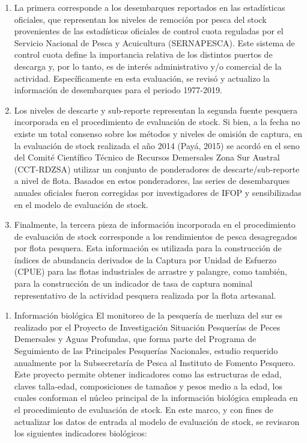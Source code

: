 \documentclass[
  spanish,
]{article}
\providecommand{\tightlist}{%
  \setlength{\itemsep}{0pt}\setlength{\parskip}{0pt}}
\begin{document}
\begin{enumerate}
\def\labelenumi{\alph{enumi})}
\item
  La primera corresponde a los desembarques reportados en las
  estadísticas oficiales, que representan los niveles de remoción por
  pesca del stock provenientes de las estadísticas oficiales de control
  cuota reguladas por el Servicio Nacional de Pesca y Acuicultura
  (SERNAPESCA). Este sistema de control cuota define la importancia
  relativa de los distintos puertos de descarga y, por lo tanto, es de
  interés administrativo y/o comercial de la actividad. Específicamente
  en esta evaluación, se revisó y actualizo la información de
  desembarques para el periodo 1977-2019.
\item
  Los niveles de descarte y sub-reporte representan la segunda fuente
  pesquera incorporada en el procedimiento de evaluación de stock. Si
  bien, a la fecha no existe un total consenso sobre los métodos y
  niveles de omisión de captura, en la evaluación de stock realizada el
  año 2014 (Payá, 2015) se acordó en el seno del Comité Científico
  Técnico de Recursos Demersales Zona Sur Austral (CCT-RDZSA) utilizar
  un conjunto de ponderadores de descarte/sub-reporte a nivel de flota.
  Basados en estos ponderadores, las series de desembarques anuales
  oficiales fueron corregidas por investigadores de IFOP y
  sensibilizadas en el modelo de evaluación de stock.
\item
  Finalmente, la tercera pieza de información incorporada en el
  procedimiento de evaluación de stock corresponde a los rendimientos de
  pesca desagregados por flota pesquera. Esta información es utilizada
  para la construcción de índices de abundancia derivados de la Captura
  por Unidad de Esfuerzo (CPUE) para las flotas industriales de arrastre
  y palangre, como también, para la construcción de un indicador de tasa
  de captura nominal representativo de la actividad pesquera realizada
  por la flota artesanal.
\end{enumerate}

\begin{enumerate}
\def\labelenumi{\roman{enumi}.}
\setcounter{enumi}{1}
\tightlist
\item
  Información biológica El monitoreo de la pesquería de merluza del sur
  es realizado por el Proyecto de Investigación Situación Pesquerías de
  Peces Demersales y Aguas Profundas, que forma parte del Programa de
  Seguimiento de las Principales Pesquerías Nacionales, estudio
  requerido anualmente por la Subsecretaría de Pesca al Instituto de
  Fomento Pesquero. Este proyecto permite obtener indicadores como las
  estructuras de edad, claves talla-edad, composiciones de tamaños y
  pesos medio a la edad, los cuales conforman el núcleo principal de la
  información biológica empleada en el procedimiento de evaluación de
  stock. En este marco, y con fines de actualizar los datos de entrada
  al modelo de evaluación de stock, se revisaron los siguientes
  indicadores biológicos:
\end{enumerate}
\end{document}
